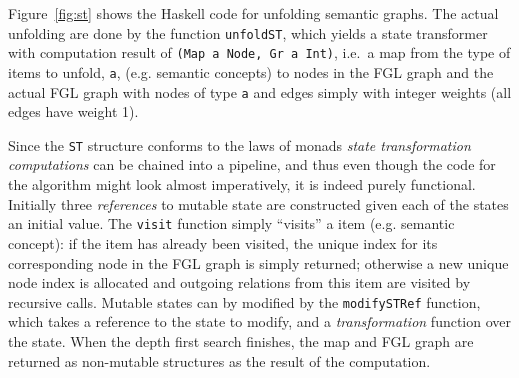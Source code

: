 Figure~\ref{fig:st} shows the Haskell code for unfolding semantic graphs. The actual unfolding are done by the function \texttt{unfoldST}, which yields a state transformer with computation result of \texttt{(Map a Node, Gr a Int)}, i.e.\ a map from the type of items to unfold, \texttt{a}, (e.g. semantic concepts) to nodes in the FGL graph and the actual FGL graph with nodes of type \texttt{a} and edges simply with integer weights (all edges have weight 1).

Since the \texttt{ST} structure conforms to the laws of monads \emph{state transformation computations} can be chained into a pipeline, and thus even though the code for the algorithm might look almost imperatively, it is indeed purely functional. Initially three \emph{references} to mutable state are constructed given each of the states an initial value. The \texttt{visit} function simply ``visits'' a item (e.g. semantic concept): if the item has already been visited, the unique index for its corresponding node in the FGL graph is simply returned; otherwise a new unique node index is allocated and outgoing relations from this item are visited by recursive calls. Mutable states can by modified by the \texttt{modifySTRef} function, which takes a reference to the state to modify, and a \emph{transformation} function over the state. When the depth first search finishes, the map and FGL graph are returned as non-mutable structures as the result of the computation.


